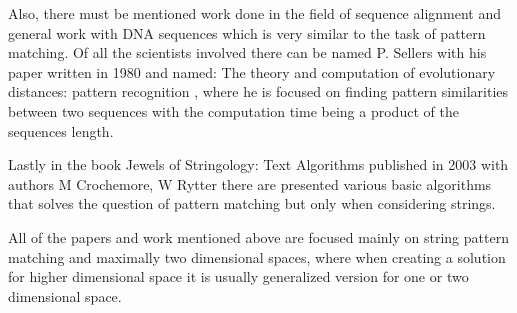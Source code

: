 Also, there must be mentioned work done in the field of sequence alignment and general work with DNA sequences which is very similar to the task of pattern matching. Of all the scientists involved there can be named P. Sellers with his paper written in 1980 and named: The theory and computation of evolutionary distances: pattern recognition \cite{evolDistances}, where he is focused on finding pattern similarities between two sequences with the computation time being a product of the sequences length.

Lastly in the book Jewels of Stringology: Text Algorithms published in 2003 \cite{stringJewels} with authors M Crochemore, W Rytter there are presented various basic algorithms that solves the question of pattern matching but only when considering strings.

All of the papers and work mentioned above are focused mainly on string pattern matching and maximally two dimensional spaces, where when creating a solution for higher dimensional space it is usually generalized version for one or two dimensional space.

